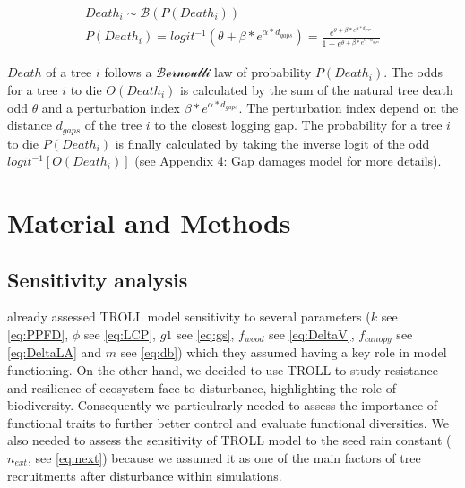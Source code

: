 \documentclass[12pt,]{article}
\let\oldsection\section
\renewcommand\section{\newpage\oldsection}
\theoremstyle{definition}
\theoremstyle{definition}
\theoremstyle{remark}
\begin{document}
\begin{equation}
  \begin{array}{c} 
    Death_i \sim \mathcal{B}(P(Death_i)) \\
    P(Death_i) = logit^{-1}(\theta + \beta*e^{\alpha*d_{gaps}}) = \frac{e^{\theta + \beta*e^{\alpha*d_{gaps}}}}{1 + e^{\theta + \beta*e^{\alpha*d_{gaps}}}}
  \end{array}
  \label{eq:death}
\end{equation}

\(Death\) of a tree \(i\) follows a \(\mathcal{Bernoulli}\) law of
probability \(P(Death_i)\). The odds for a tree \(i\) to die
\(O(Death_i)\) is calculated by the sum of the natural tree death odd
\(\theta\) and a perturbation index \(\beta*e^{\alpha*d_{gaps}}\). The
perturbation index depend on the distance \(d_{gaps}\) of the tree \(i\)
to the closest logging gap. The probability for a tree \(i\) to die
\(P(Death_i)\) is finally calculated by taking the inverse logit of the
odd \(logit^{-1}[O(Death_i)]\) (see
\protect\hyperlink{appendix-4-gap-damages-model}{Appendix 4: Gap damages
model} for more details).

\section{Material and Methods}\label{material-and-methods}

\subsection{Sensitivity analysis}\label{sensitivity-analysis}

\citet{Li} already assessed TROLL model sensitivity to several
parameters (\(k\) see \eqref{eq:PPFD}, \(\phi\) see \eqref{eq:LCP}, \(g1\)
see \eqref{eq:gs}, \(f_{wood}\) see \eqref{eq:DeltaV}, \(f_{canopy}\) see
\eqref{eq:DeltaLA} and \(m\) see \eqref{eq:db}) which they assumed having a
key role in model functioning. On the other hand, we decided to use
TROLL to study resistance and resilience of ecosystem face to
disturbance, highlighting the role of biodiversity. Consequently we
particulrarly needed to assess the importance of functional traits to
further better control and evaluate functional diversities. We also
needed to assess the sensitivity of TROLL model to the seed rain
constant (\(n_{ext}\), see \eqref{eq:next}) because we assumed it as one
of the main factors of tree recruitments after disturbance within
simulations.
\end{document}
